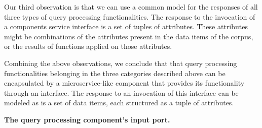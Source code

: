 
\bigskip
\noindent
Our third observation is that we can use a common model for the responses of all three types of query processing functionalities.
The response to the invocation of a components service interface is a set of tuples of attributes.
These attributes might be combinations of the attributes present in the data items of the corpus,
or the results of functions applied on those attributes.

\bigskip
\noindent
Combining the above observations,
we conclude that that query processing functionalities belonging in the three categories described above
can be encapsulated by a microservice-like component that provides its functionality through an interface.
The response to an invocation of this interface can be modeled as is a set of data items, each structured as a tuple of attributes.


\vspace{12pt}
\noindent
\textbf{The query processing component's input port.}


